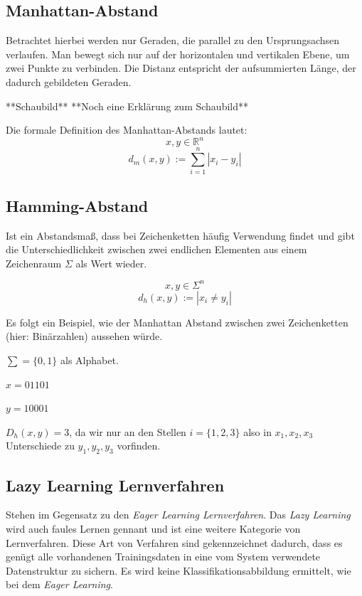 \documentclass[fontsize=11pt]{scrartcl}
\begin{document}
            \subsection{Manhattan-Abstand}
                Betrachtet hierbei werden nur Geraden, die parallel zu den Ursprungsachsen verlaufen. Man bewegt sich nur auf der horizontalen und vertikalen Ebene, um zwei Punkte zu verbinden. Die Distanz entspricht der aufsummierten Länge, der dadurch gebildeten Geraden.\par
                **Schaubild**
                **Noch eine Erklärung zum Schaubild**\par
				
                Die formale Definition des Manhattan-Abstands lautet:
                $$
                    x,y \in \mathbb{R}^n 
                $$
                $$
                    d_m(x,y):= \sum_{i=1}^{n} |x_i -y_i|
                $$
                         
            \subsection{Hamming-Abstand}
                Ist ein Abstandsmaß, dass bei Zeichenketten häufig Verwendung findet und gibt die Unterschiedlichkeit zwischen zwei endlichen Elementen aus einem Zeichenraum $\Sigma$ als Wert wieder.\par
	            $$ x,y \in \Sigma^n $$
	            $$ d_h(x,y):= |x_i \neq y_i |$$\par
                Es folgt ein Beispiel, wie der Manhattan Abstand zwischen zwei Zeichenketten (hier: Binärzahlen) aussehen würde.\par
                $\sum=\{0,1\}$ als Alphabet.\par
                $x = 01101$\par
                $y= 10001$\par
                $D_h(x,y)=3$, da wir nur an den Stellen $i=\{1,2,3\}$ also in $ x_1,x_2,x_3$ Unterschiede zu $y_1,y_2,y_3$ vorfinden.
                        
            \subsection{Lazy Learning Lernverfahren}  
                Stehen im Gegensatz zu den \emph{Eager Learning Lernverfahren}. Das \emph{Lazy Learning} wird auch faules Lernen gennant und ist eine weitere Kategorie von Lernverfahren. Diese Art von Verfahren sind gekennzeichnet dadurch, dass es genügt alle vorhandenen Trainingsdaten in eine vom System verwendete Datenstruktur zu sichern. Es wird keine Klassifikationsabbildung ermittelt, wie bei dem \emph{Eager Learning}. %
                            
\end{document}
